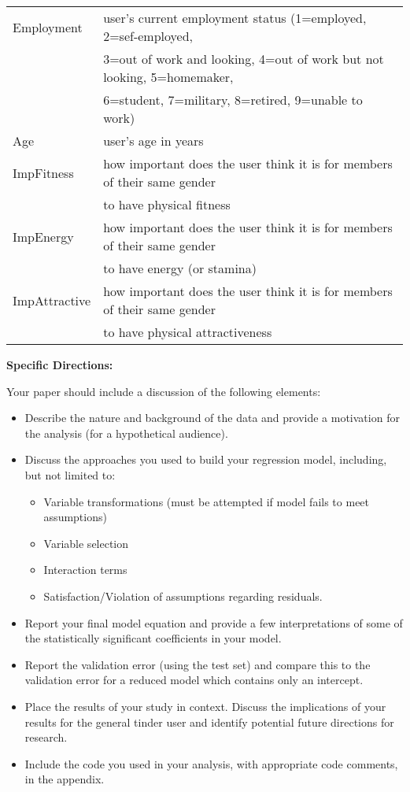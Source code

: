 \documentclass[12pt]{report}
\begin{document}
\begin{center}
\begin{tabular}{l l}
Employment & user's current employment status (1=employed, 2=sef-employed,\\
           & 3=out of work and looking, 4=out of work but not looking, 5=homemaker,\\
           & 6=student, 7=military, 8=retired, 9=unable to work)\\ \hline
Age & user's age in years\\ \hline
ImpFitness & how important does the user think it is for members of their same gender\\
          & to have physical fitness\\ \hline
ImpEnergy & how important does the user think it is for members of their same gender\\
          & to have energy (or stamina)\\ \hline
ImpAttractive & how important does the user think it is for members of their same gender\\
          & to have physical attractiveness\\ \hline
\end{tabular}
\end{center}

\newpage

\large {\bf Specific Directions:}\\
\normalsize

Your paper should include a discussion of the following elements:\\

\begin{itemize}
\item Describe the nature and background of the data and provide a motivation for the analysis (for a hypothetical audience). 
\item Discuss the approaches you used to build your regression model, including, but not limited to:
\begin{itemize}
\item Variable transformations (must be attempted if model fails to meet assumptions)
\item Variable selection 
\item Interaction terms
\item Satisfaction/Violation of assumptions regarding residuals. 
\end{itemize}
\item Report your final model equation and provide a few interpretations of some of the statistically significant coefficients in your model. 
\item Report the validation error (using the test set) and compare this to the validation error for a reduced model which contains only an intercept. 
\item Place the results of your study in context. Discuss the implications of your results for the general tinder user and identify potential future directions for research. 
\item Include the code you used in your analysis, with appropriate code comments, in the appendix. 
\end{itemize}
\end{document}
